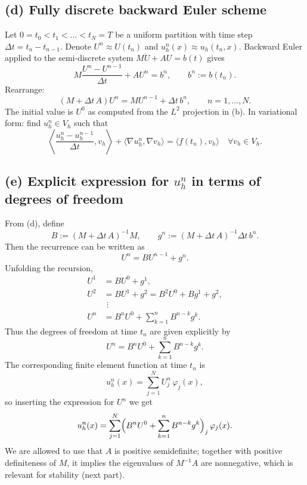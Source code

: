 \subsection*{(d) Fully discrete backward Euler scheme}
Let $0 = t_0 < t_1 < \dots < t_N = T$ be a uniform partition with time step
$\Delta t = t_n - t_{n-1}$. Denote $U^n \approx U(t_n)$ and $u_h^n(x) \approx u_h(t_n,x)$.
Backward Euler applied to the semi-discrete system $M\dot U + A U = b(t)$ gives
\[
    M\frac{U^n - U^{n-1}}{\Delta t} + A U^n = b^n,
    \qquad b^n := b(t_n).
\]
Rearrange:
\[
    (M + \Delta t\,A) U^n = M U^{n-1} + \Delta t\, b^n,
    \qquad n = 1,\dots,N.
\]
The initial value is $U^0$ as computed from the $L^2$ projection in (b).
In variational form: find $u_h^n\in V_h$ such that
\[
    \left\langle \frac{u_h^n - u_h^{n-1}}{\Delta t}, v_h\right\rangle
    + \langle \nabla u_h^n,\nabla v_h\rangle
    = \langle f(t_n), v_h\rangle
    \quad \forall v_h\in V_h.
\]
\subsection*{(e) Explicit expression for $u_h^n$ in terms of degrees of freedom}
From (d), define
\[
    B := (M + \Delta t\,A)^{-1}M,  \qquad
    g^n := (M + \Delta t\,A)^{-1} \Delta t\, b^n.
\]
Then the recurrence can be written as
\[
    U^n = B U^{n-1} + g^n.
\]
Unfolding the recursion,
\[
    \begin{aligned}
        U^1 & = B U^0 + g^1,                         \\
        U^2 & = B U^1 + g^2 = B^2 U^0 + B g^1 + g^2, \\
            & \ \,\vdots                             \\
        U^n & = B^n U^0 + \sum_{k=1}^n B^{n-k} g^k.
    \end{aligned}
\]
Thus the degrees of freedom at time $t_n$ are given explicitly by
\[
    \boxed{
        U^n = B^n U^0 + \sum_{k=1}^n B^{n-k} g^k.
    }
\]
The corresponding finite element function at time $t_n$ is
\[
    u_h^n(x) = \sum_{j=1}^N U_j^n\,\varphi_j(x),
\]
so inserting the expression for $U^n$ we get
\[
    u_h^n(x)
    = \sum_{j=1}^N \Bigl(B^n U^0 + \sum_{k=1}^n B^{n-k} g^k\Bigr)_j \,\varphi_j(x).
\]
We are allowed to use that $A$ is positive semidefinite; together with positive
definiteness of $M$, it implies the eigenvalues of $M^{-1}A$ are nonnegative,
which is relevant for stability (next part).
